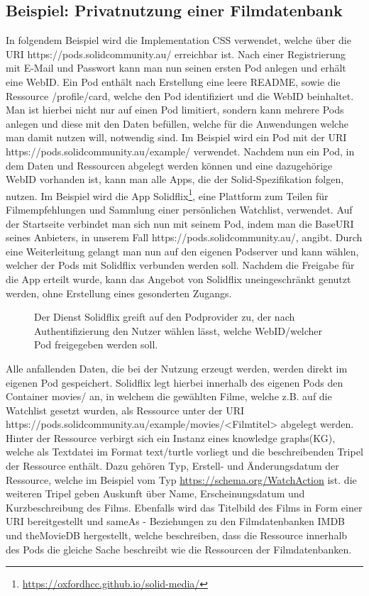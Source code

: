 \documentclass[acmtog]{acmart}
\begin{document}
\subsection{Beispiel: Privatnutzung einer Filmdatenbank}
In folgendem Beispiel wird die Implementation CSS verwendet, welche über die URI https://pods.solidcommunity.au/ erreichbar ist. Nach einer Registrierung mit E-Mail und Passwort kann man nun seinen ersten Pod anlegen und erhält eine WebID. Ein Pod enthält nach Erstellung eine leere README, sowie die Ressource /profile/card, welche den Pod identifiziert und die WebID beinhaltet. Man ist hierbei nicht nur auf einen Pod limitiert, sondern kann mehrere Pods anlegen und diese mit den Daten befüllen, welche für die Anwendungen welche man damit nutzen will, notwendig sind. Im Beispiel wird ein Pod mit der URI https://pods.solidcommunity.au/example/ verwendet.
Nachdem nun ein Pod, in dem Daten und Ressourcen abgelegt werden können und eine dazugehörige WebID vorhanden ist, kann man alle Apps, die der Solid-Spezifikation folgen, nutzen. Im Beispiel wird die App Solidflix\footnote{\url{https://oxfordhcc.github.io/solid-media/}}, eine Plattform zum Teilen für Filmempfehlungen und Sammlung einer persönlichen Watchlist, verwendet. Auf der Startseite verbindet man sich nun mit seinem Pod, indem man die BaseURI seines Anbieters, in unserem Fall https://pods.solidcommunity.au/, angibt. Durch eine Weiterleitung gelangt man nun auf den eigenen Podserver und kann wählen, welcher der Pods mit Solidflix verbunden werden soll. Nachdem die Freigabe für die App erteilt wurde, kann das Angebot von Solidflix uneingeschränkt genutzt werden, ohne Erstellung eines gesonderten Zugangs.
\begin{figure}
\label{fig:private_example}
\centering

\caption{Der Dienst Solidflix greift auf den Podprovider zu, der nach Authentifizierung den Nutzer wählen lässt, welche WebID/welcher Pod freigegeben werden soll.}
\end{figure}
Alle anfallenden Daten, die bei der Nutzung erzeugt werden, werden direkt im eigenen Pod gespeichert. Solidflix legt hierbei innerhalb des eigenen Pods den Container movies/ an, in welchem die gewählten Filme, welche z.B. auf die Watchlist gesetzt wurden, als Ressource unter der URI https://pods.solidcommunity.au/example/movies/<Filmtitel> abgelegt werden. Hinter der Ressource verbirgt sich ein Instanz eines knowledge graphs(KG), welche als Textdatei im Format text/turtle vorliegt und die beschreibenden Tripel der Ressource enthält. Dazu gehören Typ, Erstell- und Änderungsdatum der Ressource, welche im Beispiel vom Typ \url{https://schema.org/WatchAction} ist. die weiteren Tripel geben Auskunft über Name, Erscheinungsdatum und Kurzbeschreibung des Films. Ebenfalls wird das Titelbild des Films in Form einer URI bereitgestellt und sameAs - Beziehungen zu den Filmdatenbanken IMDB und theMovieDB hergestellt, welche beschreiben, dass die Ressource innerhalb des Pods die gleiche Sache beschreibt wie die Ressourcen der Filmdatenbanken.
\end{document}
